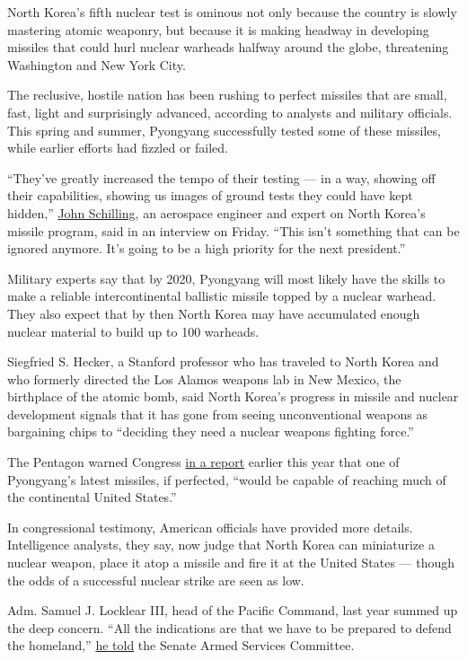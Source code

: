 North Korea's fifth nuclear test is ominous not only because the country
is slowly mastering atomic weaponry, but because it is making headway in
developing missiles that could hurl nuclear warheads halfway around the
globe, threatening Washington and New York City.

The reclusive, hostile nation has been rushing to perfect missiles that
are small, fast, light and surprisingly advanced, according to analysts
and military officials. This spring and summer, Pyongyang successfully
tested some of these missiles, while earlier efforts had fizzled or
failed.

``They've greatly increased the tempo of their testing --- in a way,
showing off their capabilities, showing us images of ground tests they
could have kept hidden,''
\href{http://38north.org/author/john-schilling/}{John Schilling}, an
aerospace engineer and expert on North Korea's missile program, said in
an interview on Friday. ``This isn't something that can be ignored
anymore. It's going to be a high priority for the next president.''

Military experts say that by 2020, Pyongyang will most likely have the
skills to make a reliable intercontinental ballistic missile topped by a
nuclear warhead. They also expect that by then North Korea may have
accumulated enough nuclear material to build up to 100 warheads.

Siegfried S. Hecker, a Stanford professor who has traveled to North
Korea and who formerly directed the Los Alamos weapons lab in New
Mexico, the birthplace of the atomic bomb, said North Korea's progress
in missile and nuclear development signals that it has gone from seeing
unconventional weapons as bargaining chips to ``deciding they need a
nuclear weapons fighting force.''

The Pentagon warned Congress
\href{http://www.defense.gov/Portals/1/Documents/pubs/Military_and_Security_Developments_Involving_the_Democratic_Peoples_Republic_of_Korea_2015.PDF}{in
a report} earlier this year that one of Pyongyang's latest missiles, if
perfected, ``would be capable of reaching much of the continental United
States.''

In congressional testimony, American officials have provided more
details. Intelligence analysts, they say, now judge that North Korea can
miniaturize a nuclear weapon, place it atop a missile and fire it at the
United States --- though the odds of a successful nuclear strike are
seen as low.

Adm. Samuel J. Locklear III, head of the Pacific Command, last year
summed up the deep concern. ``All the indications are that we have to be
prepared to defend the homeland,''
\href{http://www.pacom.mil/Media/Speeches-Testimony/Article/585392/transcript-senate-armed-services-committee-hearing-on-the-us-pacific-command-us/}{he
told} the Senate Armed Services Committee.

